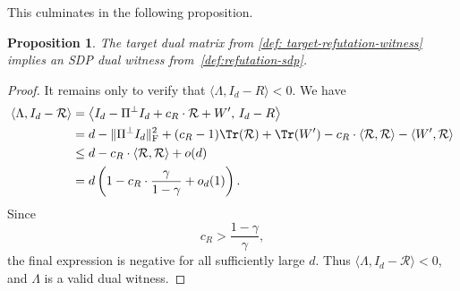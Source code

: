 \documentclass[12pt]{article}
\newcommand{\Var}{\mathrm{Var}}
\newtheorem{proposition}[theorem]{Proposition}
\newcommand{\calR}{\mathcal{R}}
\newcommand{\calS}{\mathcal{S}}
\newcommand{\gam}{\gamma}
\begin{document}
This culminates in the following proposition.
\begin{proposition}
	The target dual matrix from \cref{def: target-refutation-witness} implies an SDP dual witness from~\cref{def:refutation-sdp}.
\end{proposition}

\begin{proof}
It remains only to verify that
\(\langle\Lambda,I_d-R\rangle<0\).
We have
\begin{align*}
    \langle\Lambda,I_d-\calR\rangle
    &=
    \left\langle
        I_d-\Pi^\perp I_d+c_R\cdot  \calR+W',\,
        I_d-R
    \right\rangle                                                    \\
    &=
    d-\|\Pi^\perp I_d\|_{\mathrm F}^2
      +(c_R-1)\Tr(\calR)
      +\Tr(W')
      -c_R \cdot \langle \calR,\calR\rangle
      -\langle W',\calR\rangle                                             \\
    &\le
    d-c_R \cdot \langle \calR,\calR\rangle+o(d)                                      \\
    &=
    d\left(
        1-c_R \cdot \frac{\gamma}{1-\gamma}+o_d(1)
    \right).
\end{align*}
Since
\[
    c_R>\frac{1-\gamma}{\gamma},
\]
the final expression is negative for all sufficiently large \(d\).
Thus
\(\langle\Lambda,I_d-\calR\rangle<0\), and \(\Lambda\) is a valid dual
witness.
\end{proof}
\end{document}
